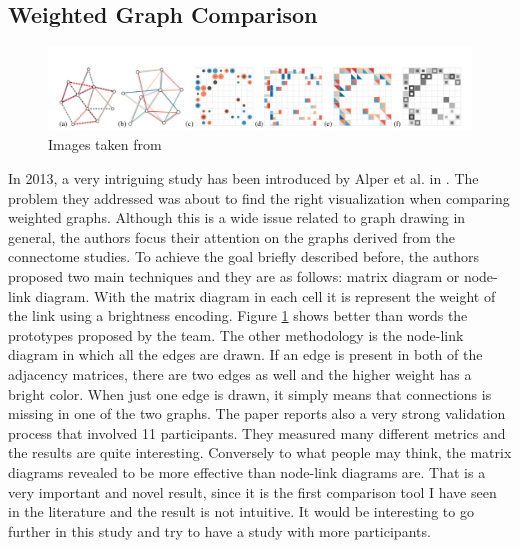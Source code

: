\documentclass{article}
\begin{document}
\begin{multicols}{2}
\subsection{Weighted Graph Comparison}
\begin{figure}[ht]
\centering
\includegraphics[width = 1.8\columnwidth]{weightedGraphs}
\caption{Images taken from \cite{weightedGraphComparison}}
\label{fig:weightedGraph}
\end{figure}

In 2013, a very intriguing study has been introduced by Alper et al. in \cite{weightedGraphComparison}. The problem they addressed was about to find the right visualization when comparing weighted graphs. Although this is a wide issue related to graph drawing in general, the authors focus their attention on the graphs derived from the connectome studies. To achieve the goal briefly described before, the authors proposed two main techniques and they are as follows: matrix diagram or node-link diagram. With the matrix diagram in each cell it is represent the weight of the link using a brightness encoding. Figure \ref{fig:weightedGraph} shows better than words the prototypes proposed by the team. The other methodology is the node-link diagram in which all the edges are drawn. If an edge is present in both of the adjacency matrices, there are two edges as well and the higher weight has a bright color. When just one edge is drawn, it simply means that connections is missing in one of the two graphs.
The paper reports also a very strong validation process that involved 11 participants. They measured many different metrics and the results are quite interesting. Conversely to what people may think, the matrix diagrams revealed to be more effective than node-link diagrams are. That is a very important and novel result, since it is the first comparison tool I have seen in the literature and the result is not intuitive. It would be interesting to go further in this study and try to have a study with more participants.\\

\end{multicols}
\end{document}
